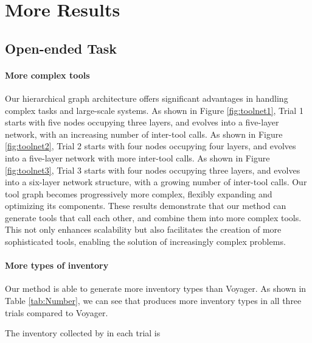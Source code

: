 \section{More Results}
\label{app:apresults}
\subsection{Open-ended Task}
\label{subsec:open-results}
\paragraph{More complex tools} 
Our hierarchical graph architecture offers significant advantages in handling complex tasks and large-scale systems. As shown in Figure \ref{fig:toolnet1}, Trial 1 starts with five nodes occupying three layers, and evolves into a five-layer network, with an increasing number of inter-tool calls. As shown in Figure \ref{fig:toolnet2}, Trial 2 starts with four nodes occupying four layers, and evolves into a five-layer network with more inter-tool calls. As shown in Figure \ref{fig:toolnet3}, Trial 3 starts with four nodes occupying three layers, and evolves into a six-layer network structure, with a growing number of inter-tool calls. Our tool graph becomes progressively more complex, flexibly expanding and optimizing its components. These results demonstrate that our method can generate tools that call each other, and combine them into more complex tools. This not only enhances scalability but also facilitates the creation of more sophisticated tools, enabling the solution of increasingly complex problems.


\paragraph{More types of inventory} Our method is able to generate more inventory types than Voyager. As shown in Table \ref{tab:Number}, we can see that {\ours} produces more inventory types in all three trials compared to Voyager.

The inventory collected by {\ours} in each trial is

